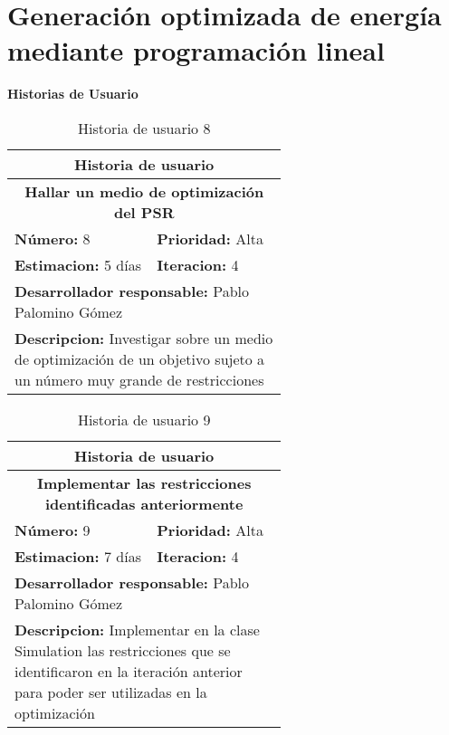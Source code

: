 
\section{Generación optimizada de energía mediante programación lineal}
\textbf{Historias de Usuario}\\

\begin{table}[H]
        \centering
        \begin{tabular}{|p{0.3\linewidth}|p{0.3\linewidth}|}
          \hline
          \multicolumn{2}{|c|}{Historia de usuario}\\ \hline
          \multicolumn{2}{|c|}{\textbf{Hallar un medio de optimización del PSR}}\\ \hline
          \textbf{Número:} 8 & \textbf{Prioridad:} Alta\\ \hline
          \textbf{Estimacion:} 5 días & \textbf{Iteracion:} 4\\ \hline
          \multicolumn{2}{|l|}{\textbf{Desarrollador responsable:} Pablo Palomino Gómez}\\ \hline
          \multicolumn{2}{|p{0.6\linewidth}|}{\textbf{Descripcion:} Investigar sobre un medio de optimización de un objetivo sujeto a un número muy grande de restricciones}\\ \hline
        \end{tabular}
        \caption{Historia de usuario 8}
        \label{tab:hist8}
\end{table}
\begin{table}[H]
        \centering
        \begin{tabular}{|p{0.3\linewidth}|p{0.3\linewidth}|}
          \hline
          \multicolumn{2}{|c|}{Historia de usuario}\\ \hline
          \multicolumn{2}{|c|}{\textbf{Implementar las restricciones identificadas anteriormente}}\\ \hline
          \textbf{Número:} 9 & \textbf{Prioridad:} Alta\\ \hline
          \textbf{Estimacion:} 7 días & \textbf{Iteracion:} 4\\ \hline
          \multicolumn{2}{|l|}{\textbf{Desarrollador responsable:} Pablo Palomino Gómez}\\ \hline
          \multicolumn{2}{|p{0.6\linewidth}|}{\textbf{Descripcion:} Implementar en la clase Simulation las restricciones que se identificaron en la iteración anterior para poder ser utilizadas en la optimización}\\ \hline
        \end{tabular}
        \caption{Historia de usuario 9}
        \label{tab:hist9}
\end{table}
